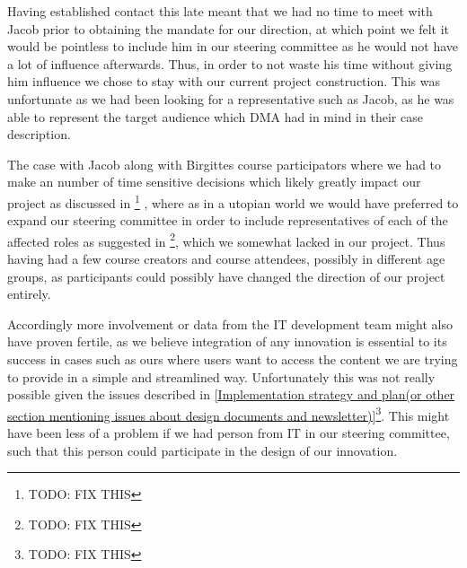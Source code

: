 Having established contact this late meant that we had no time to meet with Jacob prior to obtaining the mandate for our direction, at which point we felt it would be pointless to include him in our steering committee as he would not have a lot of influence afterwards. Thus, in order to not waste his time without giving him influence we chose to stay with our current project construction. This was unfortunate as we had been looking for a representative such as Jacob, as he was able to represent the target audience which DMA had in mind in their case description.

The case with Jacob along with Birgittes course participators where we had to make an number of time sensitive decisions which likely greatly impact our project as discussed in \cite{THE KEY TO SUCCESS IN INNOVATION}\footnote{TODO: FIX THIS} , where as in a utopian world we would have preferred to expand our steering committee in order to include representatives of each of the affected roles as suggested in \cite{callon}\footnote{TODO: FIX THIS}, which we somewhat lacked in our project. Thus having had a few course creators and course attendees, possibly in different age groups, as participants could possibly have changed the direction of our project entirely.

Accordingly more involvement or data from the IT development team might also have proven fertile, as we believe integration of any innovation is essential to its success in cases such as ours where users want to access the content we are trying to provide in a simple and streamlined way. Unfortunately this was not really possible given the issues described in \ref{Implementation strategy and plan(or other section mentioning issues about design documents and newsletter)}\footnote{TODO: FIX THIS}. This might have been less of a problem if we had person from IT in our steering committee, such that this person could participate in the design of our innovation.